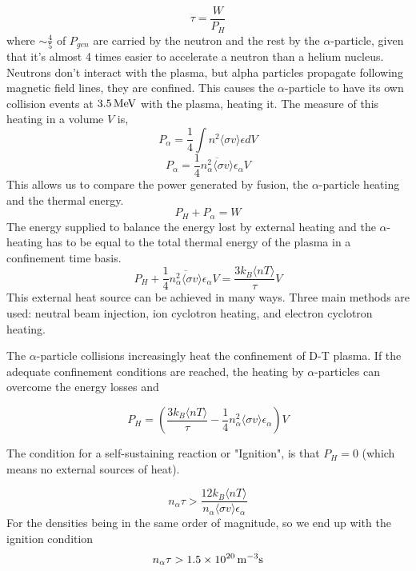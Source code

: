\documentclass[smallextended]{svjour3}
\begin{document}
\begin{equation}
     \tau = \frac{W}{P_H} 
\end{equation}
where $\sim \frac{4}{5}$ of $P_{gen}$ are carried by the neutron and the rest by the $\alpha$-particle, given that it's almost 4 times easier to accelerate a neutron than a helium nucleus. Neutrons don't interact with the plasma, but alpha particles propagate following magnetic field lines, they are confined. This causes the $\alpha$-particle to have its own collision events at $3.5 \, \rm{MeV}$ with the plasma, heating it. The measure of this heating in a volume $V$ is,
\begin{equation}
    P_{\alpha} = \frac{1}{4}\int n^2\langle\sigma v\rangle \epsilon dV
\end{equation}
\begin{equation}
    P_{\alpha} = \frac{1}{4} \overline{n_{\alpha}^2  \langle \sigma v\rangle } \epsilon_{\alpha} V 
\end{equation}
This allows us to compare the power generated by fusion, the $\alpha$-particle heating and the thermal energy.
\begin{equation}
    P_{H} + P_{\alpha} = W
\end{equation}
The energy supplied to balance the energy lost by external heating and the $\alpha$-heating has to be equal to the total thermal energy of the plasma in a confinement time basis. 
\begin{equation}
    P_{H} + \frac{1}{4} \overline{n_{\alpha}^2  \langle \sigma v\rangle } \epsilon_{\alpha} V =  \frac{3k_B \langle n T \rangle}{\tau}V
\end{equation}
This external heat source can be achieved in many ways. Three main methods are used: neutral beam injection, ion cyclotron heating, and electron cyclotron heating.

The $\alpha$-particle collisions increasingly heat the confinement of D-T plasma. If the adequate confinement conditions are reached, the heating by $\alpha$-particles can overcome the energy losses and 

\begin{equation}
    P_{H} = \left( \frac{3k_B \langle n T \rangle}{\tau}- \frac{1}{4} n_{\alpha}^2  \langle \sigma v\rangle \epsilon_{\alpha} \right) V
\end{equation}

The condition for a self-sustaining reaction or "Ignition", is that $P_H=0$ (which means no external sources of heat).

\begin{equation}
    n_{\alpha}\tau >\frac{12 k_B \langle n T \rangle}{n_{\alpha}  \langle \sigma v\rangle \epsilon_{\alpha} } 
\end{equation}
For the densities being in the same order of magnitude, so we end up with the ignition condition
\begin{equation}
    n_{\alpha}\tau > 1.5 \times 10^{20} \, \rm{m}^{-3}\rm{s}
\end{equation}
\end{document}
